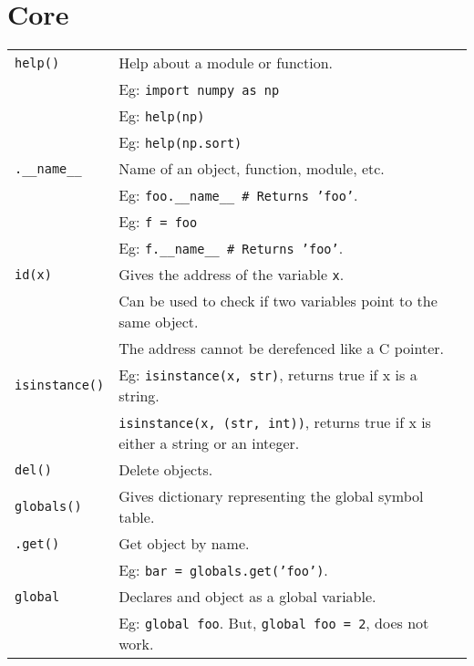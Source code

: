 \section{Core}

\begin{tabularx}{\linewidth}{lX}
    \texttt{help()}                 & Help about a module or function.\\
                                    & Eg: \texttt{import numpy as np}\\
                                    & Eg: \texttt{help(np)}\\
                                    & Eg: \texttt{help(np.sort)}\\
    \hline
    \texttt{.\_\_name\_\_}          & Name of an object, function, module, etc.\\
                                    & Eg: \texttt{foo.\_\_name\_\_ \# Returns 'foo'}.\\ 
                                    & Eg: \texttt{f = foo}\\
                                    & Eg: \texttt{f.\_\_name\_\_ \# Returns 'foo'}.\\
    \texttt{id(x)}                  & Gives the address of the variable \texttt{x}.\\ 
                                    & Can be used to check if two variables point to the same object.\\
                                    & The address cannot be derefenced like a C pointer.\\
    \texttt{isinstance()}           & Eg: \texttt{isinstance(x, str)}, returns true if x is a string.\\
                                    & \texttt{isinstance(x, (str, int))}, returns true if x is either a string or an integer.\\
    \texttt{del()}                  & Delete objects.\\
    \hline
    \texttt{globals()}              & Gives dictionary representing the global symbol table.\\
    \quad\texttt{.get()}            & Get object by name.\\
                                    & Eg: \texttt{bar = globals.get('foo')}.\\
    \texttt{global}                 & Declares and object as a global variable.\\
                                    & Eg: \texttt{global foo}. But, \texttt{global foo = 2}, does not work.\\

\end{tabularx}
